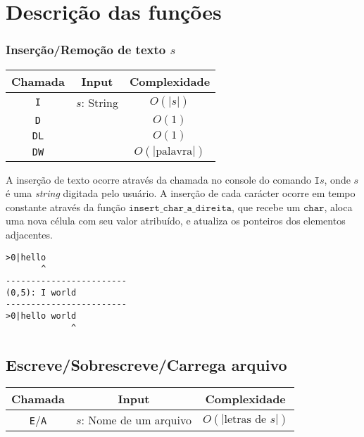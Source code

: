 \documentclass[a4paper, 11pt]{article}
\begin{document}
\section{Descrição das funções}

\subsubsection*{Inserção/Remoção de texto \texorpdfstring{$s$}{s}}

\begin{table}[H]
	\centering
	\begin{tabular}{|c|c|c|}
		\hline
		\textbf{Chamada} & \textbf{Input} & \textbf{Complexidade}
		\\ 
		\hline
		\texttt{I} & $s$: String & $O(|s|)$ \\
		\texttt{D} &  & $O(1)$ \\
		\texttt{DL} &  & $O(1)$ \\
		\texttt{DW} &  & $O(|\text{palavra}|)$ \\
		\hline
	\end{tabular}
\end{table}

A inserção de texto ocorre através da chamada no console do comando $\texttt{I}s$, onde $s$ é uma \textit{string} digitada pelo usuário. A inserção de cada carácter ocorre em tempo constante através da função $\texttt{insert\_char\_a\_direita}$, que recebe um $\texttt{char}$, aloca uma nova célula com seu valor atribuído, e atualiza os ponteiros dos elementos adjacentes.

\begin{lstlisting}[caption={Exemplo de Inserção de funções}, label={list_exemplo_de_insercao}, language={[ansi]C},firstnumber=1]
>0|hello
       ^
------------------------
(0,5): I world
------------------------
>0|hello world
             ^
\end{lstlisting}

\subsection*{Escreve/Sobrescreve/Carrega arquivo}

\begin{table}[H]
	\centering
	\begin{tabular}{|c|c|c|}
		\hline
		\textbf{Chamada} & \textbf{Input} & \textbf{Complexidade}
		\\ 
		\hline
		\texttt{E}/\texttt{A} & $s$: Nome de um arquivo & $O(|\text{letras de }s|)$ \\
		\hline
	\end{tabular}
\end{table}
\end{document}
